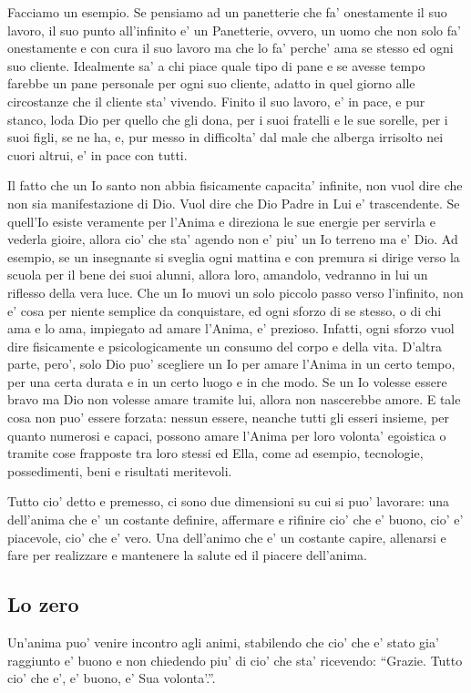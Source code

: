 Facciamo un esempio. Se pensiamo ad un panetterie che fa' onestamente il suo lavoro, il suo punto all'infinito e' un Panetterie, ovvero, un uomo che non solo fa' onestamente e con cura il suo lavoro ma che lo fa' perche' ama se stesso ed ogni suo cliente. Idealmente sa' a chi piace quale tipo di pane e se avesse tempo farebbe un pane personale per ogni suo cliente, adatto in quel giorno alle circostanze che il cliente sta' vivendo. Finito il suo lavoro, e' in pace, e pur stanco, loda Dio per quello che gli dona, per i suoi fratelli e le sue sorelle, per i suoi figli, se ne ha, e, pur messo in difficolta' dal male che alberga irrisolto nei cuori altrui, e' in pace con tutti. 

Il fatto che un Io santo non abbia fisicamente capacita' infinite, non vuol dire che non sia manifestazione di Dio. Vuol dire che Dio Padre in Lui e' trascendente. Se quell'Io esiste veramente per l'Anima e direziona le sue energie per servirla e vederla gioire, allora cio' che sta' agendo non e' piu' un Io terreno ma e' Dio.
Ad esempio, se un insegnante si sveglia ogni mattina e con premura si dirige verso la scuola per il bene dei suoi alunni, allora loro, amandolo, vedranno in lui un riflesso della vera luce.
Che un Io muovi un solo piccolo passo verso l'infinito, non e' cosa per niente semplice da conquistare, ed ogni sforzo di se stesso, o di chi ama e lo ama, impiegato ad amare l'Anima, e' prezioso. Infatti, ogni sforzo vuol dire fisicamente e psicologicamente un consumo del corpo e della vita.
D'altra parte, pero', solo Dio puo' scegliere un Io per amare l'Anima in un certo tempo, per una certa durata e in un certo luogo e in che modo. Se un Io volesse essere bravo ma Dio non volesse amare tramite lui, allora non nascerebbe amore. E tale cosa non puo' essere forzata: nessun essere, neanche tutti gli esseri insieme, per quanto numerosi e capaci, possono amare l'Anima per loro volonta' egoistica o tramite cose frapposte tra loro stessi ed Ella, come ad esempio, tecnologie, possedimenti, beni e risultati meritevoli. 

Tutto cio' detto e premesso, ci sono due dimensioni su cui si puo' lavorare: una dell'anima che e' un costante definire, affermare e rifinire cio' che e' buono, cio' e' piacevole, cio' che e' vero. Una dell'animo che e' un costante capire, allenarsi e fare per realizzare e mantenere la salute ed il piacere dell'anima.

\subsection{Lo zero}
\label{loZero}
Un'anima puo' venire incontro agli animi, stabilendo che cio' che e' stato gia' raggiunto e' buono e non chiedendo piu' di cio' che sta' ricevendo: ``Grazie. Tutto cio' che e', e' buono, e' Sua volonta'.''.


